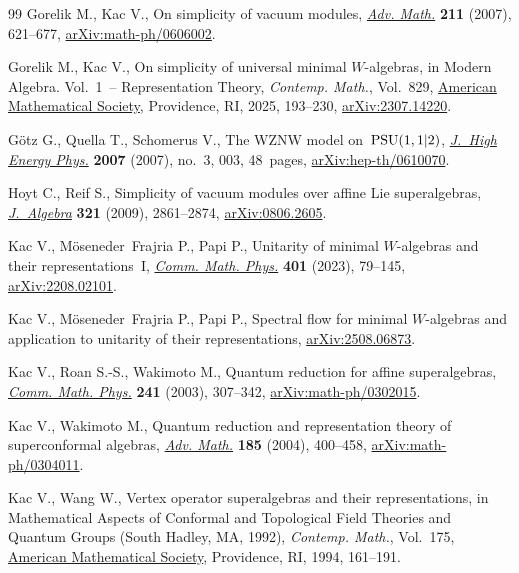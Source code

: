 \documentclass[pdftex]{sigma}
\numberwithin{equation}{section}
\begin{document}
\begin{thebibliography}{99}
Gorelik M., Kac V., On simplicity of vacuum modules,
 \href{https://doi.org/10.1016/j.aim.2006.09.004}{\textit{Adv. Math.}}
 \textbf{211} (2007), 621--677,
 \href{http://arxiv.org/abs/math-ph/0606002}{arXiv:math-ph/0606002}.

Gorelik M., Kac V., On simplicity of universal minimal {$W$}-algebras, in
 Modern {A}lgebra. {V}ol.~1~-- {R}epresentation {T}heory, \textit{Contemp.
 Math.}, Vol.~829, \href{https://doi.org/10.1090/conm/829/16549}{American
 Mathematical Society}, Providence, RI, 2025, 193--230,
 \href{http://arxiv.org/abs/2307.14220}{arXiv:2307.14220}.

G\"otz G., Quella T., Schomerus V., The {WZNW} model on~{${\rm PSU}(1,1|2)$},
 \href{https://doi.org/10.1088/1126-6708/2007/03/003}{\textit{J.~High Energy
 Phys.}} \textbf{2007} (2007), no.~3, 003, 48~pages,
 \href{http://arxiv.org/abs/hep-th/0610070}{arXiv:hep-th/0610070}.

Hoyt C., Reif S., Simplicity of vacuum modules over affine {L}ie superalgebras,
 \href{https://doi.org/10.1016/j.jalgebra.2009.02.003}{\textit{J.~Algebra}}
 \textbf{321} (2009), 2861--2874,
 \href{http://arxiv.org/abs/0806.2605}{arXiv:0806.2605}.

Kac V., M\"oseneder~Frajria P., Papi P., Unitarity of minimal {$W$}-algebras
 and their representations~{I},
 \href{https://doi.org/10.1007/s00220-023-04637-5}{\textit{Comm. Math. Phys.}}
 \textbf{401} (2023), 79--145,
 \href{http://arxiv.org/abs/2208.02101}{arXiv:2208.02101}.

Kac V., M\"oseneder~Frajria P., Papi P., Spectral flow for minimal
 {$W$}-algebras and application to unitarity of their representations,
 \href{http://arxiv.org/abs/2508.06873}{arXiv:2508.06873}.

Kac V., Roan S.-S., Wakimoto M., Quantum reduction for affine superalgebras,
 \href{https://doi.org/10.1007/s00220-003-0926-1}{\textit{Comm. Math. Phys.}}
 \textbf{241} (2003), 307--342,
 \href{http://arxiv.org/abs/math-ph/0302015}{arXiv:math-ph/0302015}.

Kac V., Wakimoto M., Quantum reduction and representation theory of
 superconformal algebras,
 \href{https://doi.org/10.1016/j.aim.2003.12.005}{\textit{Adv. Math.}}
 \textbf{185} (2004), 400--458,
 \href{http://arxiv.org/abs/math-ph/0304011}{arXiv:math-ph/0304011}.

Kac V., Wang W., Vertex operator superalgebras and their representations, in
 Mathematical {A}spects of {C}onformal and {T}opological {F}ield {T}heories
 and {Q}uantum {G}roups ({S}outh {H}adley, {MA}, 1992), \textit{Contemp.
 Math.}, Vol.~175, \href{https://doi.org/10.1090/conm/175/01843}{American
 Mathematical Society}, Providence, RI, 1994, 161--191.


\end{thebibliography}
\end{document}
